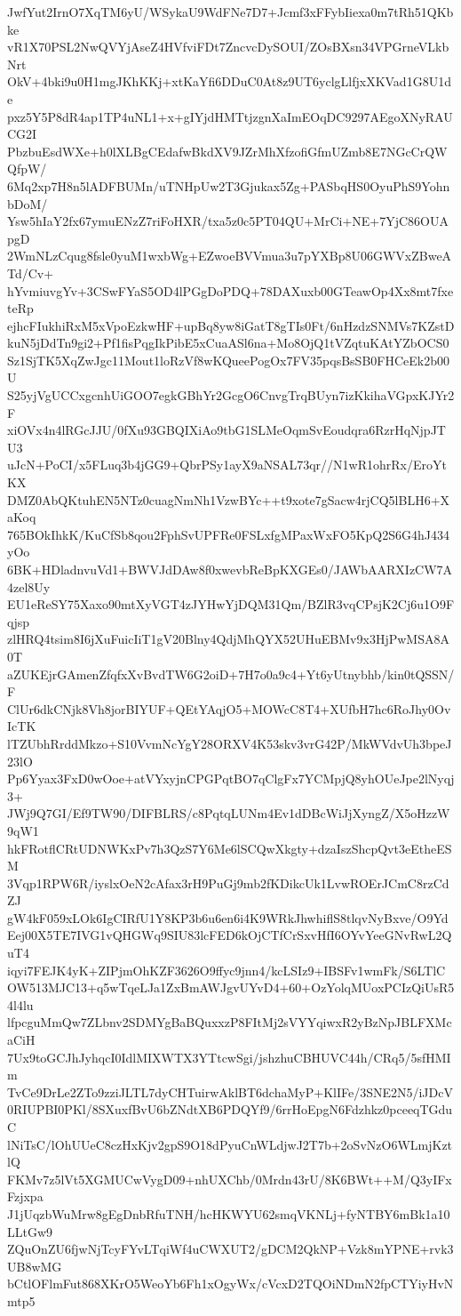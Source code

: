 JwfYut2IrnO7XqTM6yU/WSykaU9WdFNe7D7+Jcmf3xFFybIiexa0m7tRh51QKbke
vR1X70PSL2NwQVYjAseZ4HVfviFDt7ZncvcDySOUI/ZOsBXsn34VPGrneVLkbNrt
OkV+4bki9u0H1mgJKhKKj+xtKaYfi6DDuC0At8z9UT6yclgLlfjxXKVad1G8U1de
pxz5Y5P8dR4ap1TP4uNL1+x+gIYjdHMTtjzgnXaImEOqDC9297AEgoXNyRAUCG2I
PbzbuEsdWXe+h0lXLBgCEdafwBkdXV9JZrMhXfzofiGfmUZmb8E7NGcCrQWQfpW/
6Mq2xp7H8n5lADFBUMn/uTNHpUw2T3Gjukax5Zg+PASbqHS0OyuPhS9YohnbDoM/
Ysw5hIaY2fx67ymuENzZ7riFoHXR/txa5z0c5PT04QU+MrCi+NE+7YjC86OUApgD
2WmNLzCqug8fsle0yuM1wxbWg+EZwoeBVVmua3u7pYXBp8U06GWVxZBweATd/Cv+
hYvmiuvgYv+3CSwFYaS5OD4lPGgDoPDQ+78DAXuxb00GTeawOp4Xx8mt7fxeteRp
ejhcFIukhiRxM5xVpoEzkwHF+upBq8yw8iGatT8gTIs0Ft/6nHzdzSNMVs7KZstD
kuN5jDdTn9gi2+Pf1fisPqgIkPibE5xCuaASl6na+Mo8OjQ1tVZqtuKAtYZbOCS0
Sz1SjTK5XqZwJgc11Mout1loRzVf8wKQueePogOx7FV35pqsBsSB0FHCeEk2b00U
S25yjVgUCCxgcnhUiGOO7egkGBhYr2GcgO6CnvgTrqBUyn7izKkihaVGpxKJYr2F
xiOVx4n4lRGcJJU/0fXu93GBQIXiAo9tbG1SLMeOqmSvEoudqra6RzrHqNjpJTU3
uJcN+PoCI/x5FLuq3b4jGG9+QbrPSy1ayX9aNSAL73qr//N1wR1ohrRx/EroYtKX
DMZ0AbQKtuhEN5NTz0cuagNmNh1VzwBYc++t9xote7gSacw4rjCQ5lBLH6+XaKoq
765BOkIhkK/KuCfSb8qou2FphSvUPFRe0FSLxfgMPaxWxFO5KpQ2S6G4hJ434yOo
6BK+HDladnvuVd1+BWVJdDAw8f0xwevbReBpKXGEs0/JAWbAARXIzCW7A4zel8Uy
EU1eReSY75Xaxo90mtXyVGT4zJYHwYjDQM31Qm/BZlR3vqCPsjK2Cj6u1O9Fqjsp
zlHRQ4tsim8I6jXuFuicIiT1gV20Blny4QdjMhQYX52UHuEBMv9x3HjPwMSA8A0T
aZUKEjrGAmenZfqfxXvBvdTW6G2oiD+7H7o0a9c4+Yt6yUtnybhb/kin0tQSSN/F
ClUr6dkCNjk8Vh8jorBIYUF+QEtYAqjO5+MOWcC8T4+XUfbH7hc6RoJhy0OvIcTK
lTZUbhRrddMkzo+S10VvmNcYgY28ORXV4K53skv3vrG42P/MkWVdvUh3bpeJ23lO
Pp6Yyax3FxD0wOoe+atVYxyjnCPGPqtBO7qClgFx7YCMpjQ8yhOUeJpe2lNyqj3+
JWj9Q7GI/Ef9TW90/DIFBLRS/c8PqtqLUNm4Ev1dDBcWiJjXyngZ/X5oHzzW9qW1
hkFRotflCRtUDNWKxPv7h3QzS7Y6Me6lSCQwXkgty+dzaIszShcpQvt3eEtheESM
3Vqp1RPW6R/iyslxOeN2cAfax3rH9PuGj9mb2fKDikcUk1LvwROErJCmC8rzCdZJ
gW4kF059xLOk6IgCIRfU1Y8KP3b6u6en6i4K9WRkJhwhiflS8tlqvNyBxve/O9Yd
Eej00X5TE7IVG1vQHGWq9SIU83lcFED6kOjCTfCrSxvHfI6OYvYeeGNvRwL2QuT4
iqyi7FEJK4yK+ZIPjmOhKZF3626O9ffyc9jnn4/kcLSIz9+IBSFv1wmFk/S6LTlC
OW513MJC13+q5wTqeLJa1ZxBmAWJgvUYvD4+60+OzYolqMUoxPCIzQiUsR54l4lu
lfpcguMmQw7ZLbnv2SDMYgBaBQuxxzP8FItMj2sVYYqiwxR2yBzNpJBLFXMcaCiH
7Ux9toGCJhJyhqcI0IdlMIXWTX3YTtcwSgi/jshzhuCBHUVC44h/CRq5/5sfHMIm
TvCe9DrLe2ZTo9zziJLTL7dyCHTuirwAklBT6dchaMyP+KlIFe/3SNE2N5/iJDcV
0RIUPBI0PKl/8SXuxfBvU6bZNdtXB6PDQYf9/6rrHoEpgN6Fdzhkz0pceeqTGduC
lNiTsC/lOhUUeC8czHxKjv2gpS9O18dPyuCnWLdjwJ2T7b+2oSvNzO6WLmjKztlQ
FKMv7z5lVt5XGMUCwVygD09+nhUXChb/0Mrdn43rU/8K6BWt++M/Q3yIFxFzjxpa
J1jUqzbWuMrw8gEgDnbRfuTNH/hcHKWYU62smqVKNLj+fyNTBY6mBk1a10LLtGw9
ZQuOnZU6fjwNjTcyFYvLTqiWf4uCWXUT2/gDCM2QkNP+Vzk8mYPNE+rvk3UB8wMG
bCtlOFlmFut868XKrO5WeoYb6Fh1xOgyWx/cVcxD2TQOiNDmN2fpCTYiyHvNmtp5
